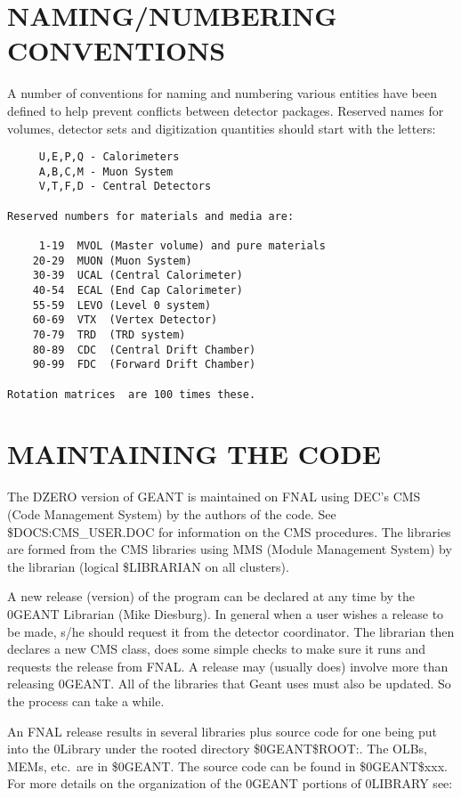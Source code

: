\section{NAMING/NUMBERING CONVENTIONS }
\label{naming}

A number of conventions for naming and numbering various entities have been
defined to help prevent conflicts between detector packages. Reserved names for
volumes, detector sets and digitization quantities should start with the
letters:

\begin{verbatim}
     U,E,P,Q - Calorimeters
     A,B,C,M - Muon System
     V,T,F,D - Central Detectors

Reserved numbers for materials and media are:

     1-19  MVOL (Master volume) and pure materials
    20-29  MUON (Muon System)
    30-39  UCAL (Central Calorimeter)
    40-54  ECAL (End Cap Calorimeter)
    55-59  LEVO (Level 0 system)
    60-69  VTX  (Vertex Detector)
    70-79  TRD  (TRD system)
    80-89  CDC  (Central Drift Chamber)
    90-99  FDC  (Forward Drift Chamber)

Rotation matrices  are 100 times these.
\end{verbatim}

\section{MAINTAINING THE CODE}
\label{maint}

The DZERO version of GEANT is maintained on FNAL using DEC's CMS (Code
Management System) by the authors of the code. See \$DOCS:CMS\_USER.DOC for
information on the CMS procedures. The libraries are formed from the CMS
libraries using MMS (Module Management System) by the  librarian (logical
\$LIBRARIAN on all  clusters).

A new release (version) of the program can be declared at any time by the
\D0GEANT Librarian (Mike Diesburg). In general when a user wishes a release
to be made, s/he should request it from the detector coordinator. The librarian
then declares a new CMS class, does some simple checks to make sure it runs and
requests the release from FNAL. A release may (usually does) involve more
than releasing \D0GEANT. All of the libraries that Geant uses must also be
updated. So the process can take a while.

An FNAL release results in several libraries plus source code for one being
put into the \D0Library under the rooted directory \$\D0GEANT\$ROOT:. The
OLBs, MEMs, etc.\ are in \$\D0GEANT. The source code can be found in
\$\D0GEANT\$xxx. For more details on the organization of the \D0GEANT
portions of \D0LIBRARY see:  


